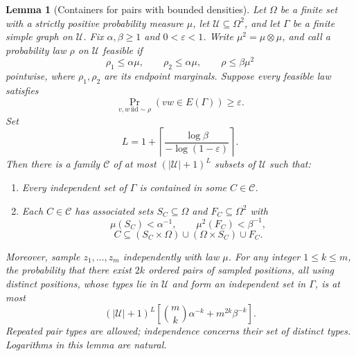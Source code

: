\documentclass[11pt]{article}
\newtheorem{lemma}{Lemma}
\begin{document}
\begin{lemma}[Containers for pairs with bounded densities]
\label{lem:pair-containers}
Let $\Omega$ be a finite set with a strictly positive probability measure $\mu$, let $\mathcal U\subseteq\Omega^2$, and let $\Gamma$ be a finite simple graph on $\mathcal U$. Fix $\alpha,\beta\ge1$ and $0<\varepsilon<1$. Write $\mu^2=\mu\otimes\mu$, and call a probability law $\rho$ on $\mathcal U$ feasible if
\[
\rho_1\le\alpha\mu,\qquad \rho_2\le\alpha\mu,\qquad
\rho\le\beta\mu^2
\]
pointwise, where $\rho_1,\rho_2$ are its endpoint marginals. Suppose every feasible law satisfies
\[
\Pr_{v,w\,\mathrm{iid}\sim\rho}(vw\in E(\Gamma))\ge\varepsilon.
\]
Set
\[
L=1+\left\lceil\frac{\log\beta}{-\log(1-\varepsilon)}\right\rceil.
\]
Then there is a family $\mathcal C$ of at most $(|\mathcal U|+1)^L$ subsets of $\mathcal U$ such that:
\begin{enumerate}
\item Every independent set of $\Gamma$ is contained in some $C\in\mathcal C$.
\item Each $C\in\mathcal C$ has associated sets $S_C\subseteq\Omega$ and $F_C\subseteq\Omega^2$ with
\[
\mu(S_C)<\alpha^{-1},\qquad \mu^2(F_C)<\beta^{-1},
\]
\[
C\subseteq(S_C\times\Omega)\cup(\Omega\times S_C)\cup F_C.
\]
\end{enumerate}
Moreover, sample $z_1,\ldots,z_m$ independently with law $\mu$. For any integer $1\le k\le m$, the probability that there exist $2k$ ordered pairs of sampled positions, all using distinct positions, whose types lie in $\mathcal U$ and form an independent set in $\Gamma$, is at most
\begin{equation}
(|\mathcal U|+1)^L
\left[\binom{m}{k}\alpha^{-k}+m^{2k}\beta^{-k}\right].
\label{eq:abstract-sampling-bound}
\end{equation}
Repeated pair types are allowed; independence concerns their set of distinct types. Logarithms in this lemma are natural.
\end{lemma}
\end{document}
